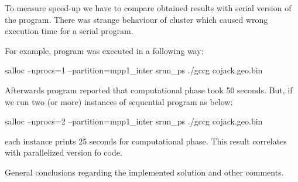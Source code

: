 \documentclass[12pt, a4paper]{article}
\newcommand{\draft}[1]{\textcolor{NavyBlue}{#1}}
\begin{document}
To measure speed-up we have to compare obtained results with serial version of the program.
There was strange behaviour of cluster which caused wrong execution time for a serial program.

For example, program was executed in a following way:
\begin{cpp}
	salloc --nprocs=1 --partition=mpp1_inter
	srun_ps ./gccg cojack.geo.bin
\end{cpp}

Afterwards program reported that computational phase took 50 seconds.
But, if we run two (or more) instances of sequential program as below:
\begin{cpp}
	salloc --nprocs=2 --partition=mpp1_inter
	srun_ps ./gccg cojack.geo.bin
\end{cpp}

\noindent
each instance prints 25 seconds for computational phase.
This result correlates with parallelized version fo code.



\draft{
General conclusions regarding the implemented solution and other comments.
}
\end{document}
